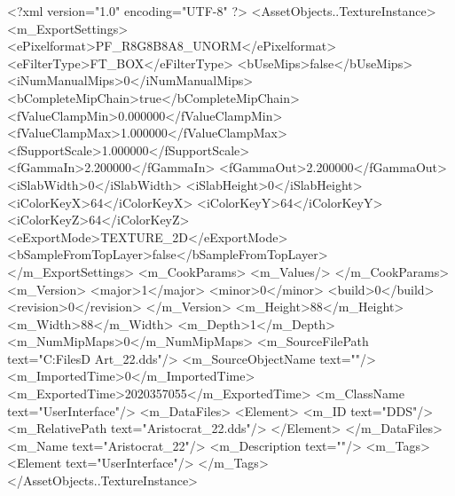 <?xml version="1.0" encoding="UTF-8" ?>
<AssetObjects..TextureInstance>
	<m_ExportSettings>
		<ePixelformat>PF_R8G8B8A8_UNORM</ePixelformat>
		<eFilterType>FT_BOX</eFilterType>
		<bUseMips>false</bUseMips>
		<iNumManualMips>0</iNumManualMips>
		<bCompleteMipChain>true</bCompleteMipChain>
		<fValueClampMin>0.000000</fValueClampMin>
		<fValueClampMax>1.000000</fValueClampMax>
		<fSupportScale>1.000000</fSupportScale>
		<fGammaIn>2.200000</fGammaIn>
		<fGammaOut>2.200000</fGammaOut>
		<iSlabWidth>0</iSlabWidth>
		<iSlabHeight>0</iSlabHeight>
		<iColorKeyX>64</iColorKeyX>
		<iColorKeyY>64</iColorKeyY>
		<iColorKeyZ>64</iColorKeyZ>
		<eExportMode>TEXTURE_2D</eExportMode>
		<bSampleFromTopLayer>false</bSampleFromTopLayer>
	</m_ExportSettings>
	<m_CookParams>
		<m_Values/>
	</m_CookParams>
	<m_Version>
		<major>1</major>
		<minor>0</minor>
		<build>0</build>
		<revision>0</revision>
	</m_Version>
	<m_Height>88</m_Height>
	<m_Width>88</m_Width>
	<m_Depth>1</m_Depth>
	<m_NumMipMaps>0</m_NumMipMaps>
	<m_SourceFilePath text="C:\Users\Shadow\Desktop\Working Files\2D Art\Quarters\Aristocrat\Aristocrat_22.dds"/>
	<m_SourceObjectName text=""/>
	<m_ImportedTime>0</m_ImportedTime>
	<m_ExportedTime>2020357055</m_ExportedTime>
	<m_ClassName text="UserInterface"/>
	<m_DataFiles>
		<Element>
			<m_ID text="DDS"/>
			<m_RelativePath text="Aristocrat_22.dds"/>
		</Element>
	</m_DataFiles>
	<m_Name text="Aristocrat_22"/>
	<m_Description text=""/>
	<m_Tags>
		<Element text="UserInterface"/>
	</m_Tags>
</AssetObjects..TextureInstance>

